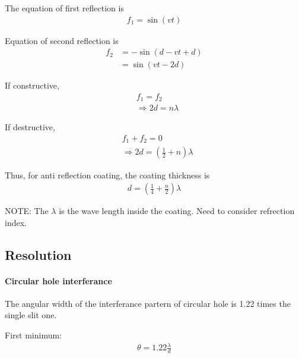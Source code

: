            The equation of first reflection is 
            \begin{align}
                f_1 = \sin (v t)
            \end{align}

            Equation of second reflection is
            \begin{align}
                f_2 &= - \sin (d - vt + d) \\
                    &= \sin (vt - 2d)
            \end{align}


            If constructive, 
            \begin{align}
                & f_1 = f_2 \\
                & \Rightarrow 2 d = n \lambda
            \end{align}

            If destructive,
            \begin{align}
                & f_1 + f_2 = 0 \\
                & \Rightarrow 2d = (\frac{1}{2} + n) \lambda
            \end{align}

            Thus, for anti reflection coating, the coating thickness is
            \begin{align}
                d = (\frac{1}{4} + \frac{n}{2}) \lambda
            \end{align}

            NOTE: The $\lambda$ is the wave length inside the coating. Need to consider refrection index.
    
    \subsection{Resolution}
        \paragraph{Circular hole interferance}
            The angular width of the interferance partern of circular hole is 1.22 times the single slit one.

            First minimum:
            \begin{align}
                \theta = 1.22 \frac{\lambda}{d}
            \end{align}

